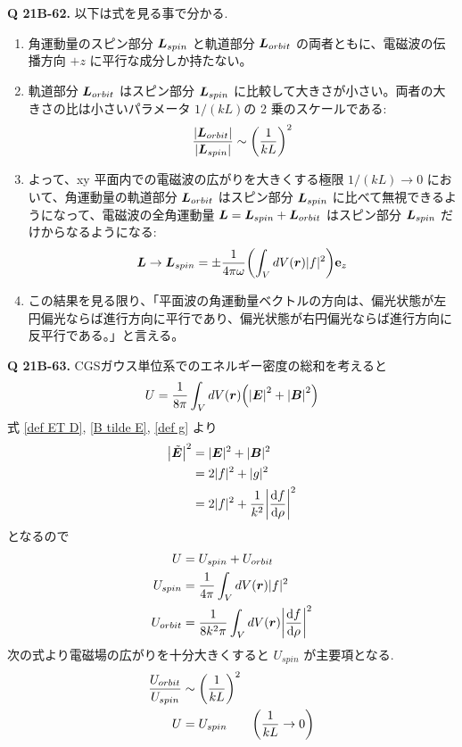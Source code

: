 \documentclass[uplatex,dvipdfmx,a4paper,11pt]{jlreq}
\newcommand{\EE}{\bm{E}}
\newcommand{\BB}{\bm{B}}
\newcommand{\rr}{\bm{r}}
\theoremstyle{definition}
\begin{document}
\textbf{Q 21B-62.}
以下は式を見る事で分かる.
\begin{enumerate}
  \item 角運動量のスピン部分 $\bm{L}_{spin}$ と軌道部分 $\bm{L}_{orbit}$ の両者ともに、電磁波の伝播方向 $+z$ に平行な成分しか持たない。
  \item 軌道部分 $\bm{L}_{orbit}$ はスピン部分 $\bm{L}_{spin}$ に比較して大きさが小さい。両者の大きさの比は小さいパラメータ $1/(kL)$の 2 乗のスケールである:
        \begin{align}
          \frac{|\bm{L}_{orbit}|}{|\bm{L}_{spin}|} \sim \qty(\frac{1}{kL})^2
        \end{align}
  \item よって、xy 平面内での電磁波の広がりを大きくする極限 $1/(kL) \to 0$ において、角運動量の軌道部分 $\bm{L}_{orbit}$ はスピン部分 $\bm{L}_{spin}$ に比べて無視できるようになって、電磁波の全角運動量 $\bm{L} = \bm{L}_{spin} + \bm{L}_{orbit}$ はスピン部分 $\bm{L}_{spin}$ だけからなるようになる:
        \begin{align}
          \LL \to \LL_{spin} = \pm \frac{1}{4\pi\omega}\qty(\int_VdV(\rr)|f|^2)\vb{e}_z \label{L limit}
        \end{align}
  \item この結果を見る限り、「平面波の角運動量ベクトルの方向は、偏光状態が左円偏光ならば進行方向に平行であり、偏光状態が右円偏光ならば進行方向に反平行である。」と言える。
\end{enumerate}

\textbf{Q 21B-63.}
CGSガウス単位系でのエネルギー密度の総和を考えると
\begin{align}
  U = \frac{1}{8\pi}\int_VdV(\rr)\qty(\qty|\EE|^2 + \qty|\BB|^2)
\end{align}
式 \eqref{def ET D}, \eqref{B tilde E}, \eqref{def g} より
\begin{align}
  \qty|\ET|^2 & = |\EE|^2 + |\BB|^2                          \\
              & = 2|f|^2 + |g|^2                             \\
              & = 2|f|^2 + \frac{1}{k^2}\qty|\dv{f}{\rho}|^2
\end{align}
となるので
\begin{align}
  U         & = U_{spin} + U_{orbit}                               \\
  U_{spin}  & = \frac{1}{4\pi}\int_VdV(\rr)|f|^2                   \\
  U_{orbit} & = \frac{1}{8k^2\pi}\int_VdV(\rr)\qty|\dv{f}{\rho}|^2 \\
\end{align}
次の式より電磁場の広がりを十分大きくすると $U_{spin}$ が主要項となる.
\begin{align}
  \frac{U_{orbit}}{U_{spin}} & \sim \qty(\frac{1}{kL})^2                                                \\
  U                          & = U_{spin}                \qquad \qty(\frac{1}{kL}\to 0) \label{U limit}
\end{align}
\end{document}

